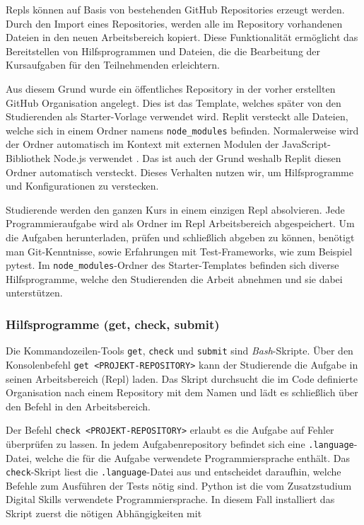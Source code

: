 Repls können auf Basis von bestehenden GitHub Repositories erzeugt werden. Durch
den Import eines Repositories, werden alle im Repository vorhandenen Dateien
in den neuen Arbeitsbereich kopiert. Diese Funktionalität ermöglicht das
Bereitstellen von Hilfsprogrammen und Dateien, die die Bearbeitung der
Kursaufgaben für den Teilnehmenden erleichtern.

Aus diesem Grund wurde ein öffentliches Repository in der vorher erstellten
GitHub Organisation angelegt. Dies ist das Template, welches später von den
Studierenden als Starter-Vorlage verwendet wird. Replit versteckt alle Dateien,
welche sich in einem Ordner namens \texttt{node\_modules} befinden.
Normalerweise wird der Ordner automatisch im Kontext mit externen Modulen der
JavaScript-Bibliothek Node.js verwendet \parencite{nodejs}. Das ist auch der Grund
weshalb Replit diesen Ordner automatisch versteckt. Dieses Verhalten nutzen wir,
um Hilfsprogramme und Konfigurationen zu verstecken.

Studierende werden den ganzen Kurs in einem einzigen Repl absolvieren. Jede
Programmieraufgabe wird als Ordner im Repl Arbeitsbereich abgespeichert. Um die
Aufgaben herunterladen, prüfen und schließlich abgeben zu können, benötigt man
Git-Kenntnisse, sowie Erfahrungen mit Test-Frameworks, wie zum Beispiel pytest.
Im \texttt{node\_modules}-Ordner des Starter-Templates befinden sich diverse
Hilfsprogramme, welche den Studierenden die Arbeit abnehmen und sie dabei
unterstützen.

\subsubsection{Hilfsprogramme (get, check, submit)}
\label{replit-template-wrapper-tools}
Die Kommandozeilen-Tools \texttt{get}, \texttt{check} und \texttt{submit} sind
\emph{Bash}-Skripte. Über den Konsolenbefehl \texttt{get <PROJEKT-REPOSITORY>} kann der
Studierende die Aufgabe in seinen Arbeitsbereich (Repl) laden. Das Skript
durchsucht die im Code definierte Organisation nach einem Repository mit dem
Namen und lädt es schließlich über den Befehl  in den
Arbeitsbereich.

Der Befehl \texttt{check <PROJEKT-REPOSITORY>} erlaubt es die Aufgabe auf Fehler
überprüfen zu lassen. In jedem Aufgabenrepository befindet sich eine
\texttt{.language}-Datei, welche die für die Aufgabe verwendete
Programmiersprache enthält. Das \texttt{check}-Skript liest die
\texttt{.language}-Datei aus und entscheidet daraufhin, welche Befehle zum
Ausführen der Tests nötig sind. Python ist die vom Zusatzstudium Digital Skills
verwendete Programmiersprache. In diesem Fall installiert das Skript zuerst die
nötigen Abhängigkeiten mit

